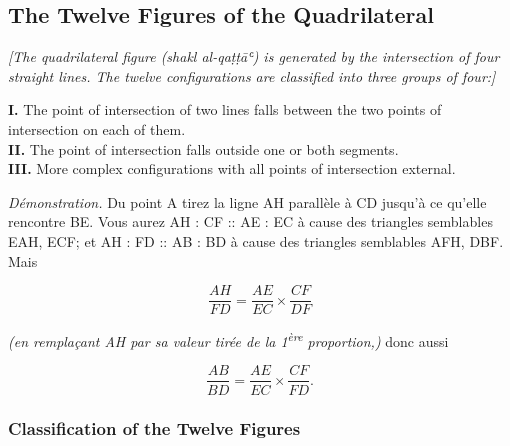 \documentclass[11pt,a4paper]{article}
\theoremstyle{plain}
\theoremstyle{definition}
\theoremstyle{remark}
\begin{document}
\subsection{The Twelve Figures of the Quadrilateral}

\label{sec:12figs}



\noindent\textit{[The quadrilateral figure (shakl al-qaṭṭāʿ) is generated by the intersection of four straight lines. The twelve configurations are classified into three groups of four:]}\\



\begin{center}

\textbf{I.} The point of intersection of two lines falls between the two points of intersection on each of them.\\[0.3cm]

\textbf{II.} The point of intersection falls outside one or both segments.\\[0.3cm]

\textbf{III.} More complex configurations with all points of intersection external.\\[0.3cm]

\end{center}





\textit{Démonstration.} Du point A tirez la ligne AH parallèle à CD jusqu'à ce qu'elle rencontre BE. Vous aurez AH : CF :: AE : EC à cause des triangles semblables EAH, ECF; et AH : FD :: AB : BD à cause des triangles semblables AFH, DBF. Mais

\[

\frac{AH}{FD} = \frac{AE}{EC} \times \frac{CF}{DF}

\]

\textit{(en remplaçant AH par sa valeur tirée de la 1\textsuperscript{ère} proportion,)} donc aussi

\[

\frac{AB}{BD} = \frac{AE}{EC} \times \frac{CF}{FD}.

\]





\subsubsection*{Classification of the Twelve Figures}
\end{document}
